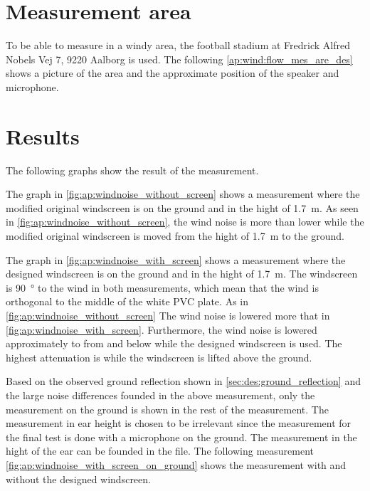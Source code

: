 \section*{Measurement area}
To be able to measure in a windy area, the football stadium at Fredrick Alfred Nobels Vej 7, 9220 Aalborg is used. The following \autoref{ap:wind:flow_mes_are_des} shows a picture of the area and the approximate position of the speaker and microphone.


\section*{Results}

The following graphs show the result of the measurement. 



The graph in \autoref{fig:ap:windnoise_without_screen} shows a measurement where the modified original windscreen is on the ground and in the hight of \SI{1.7}{\meter}. 
As seen in \autoref{fig:ap:windnoise_without_screen}, the wind noise is more than  lower while the modified original windscreen is moved from the hight of \SI{1.7}{\meter} to the ground. 



The graph in \autoref{fig:ap:windnoise_with_screen} shows a measurement where the designed windscreen is on the ground and in the hight of \SI{1.7}{\meter}. The windscreen is \SI{90}{\degree} to the wind in both measurements, which mean that the wind is orthogonal to the middle of the white PVC plate. 
As in \autoref{fig:ap:windnoise_without_screen} The wind noise is lowered more that   in \autoref{fig:ap:windnoise_with_screen}. Furthermore, the wind noise is lowered approximately  to  from  and below while the designed windscreen is used. The highest attenuation is while the windscreen is lifted above the ground.

Based on the observed ground reflection shown in \autoref{sec:des:ground_reflection} and the large noise differences founded in the above measurement, only the measurement on the ground is shown in the rest of the measurement. The measurement in ear height is chosen to be irrelevant since the measurement for the final test is done with a microphone on the ground. The measurement in the hight of the ear can be founded in the file. The following measurement \autoref{fig:ap:windnoise_with_screen_on_ground} shows the measurement with and without the designed windscreen. 



